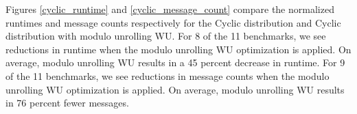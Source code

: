 Figures \ref{cyclic_runtime} and \ref{cyclic_message_count} compare the normalized runtimes and message counts respectively for the Cyclic distribution and Cyclic distribution with modulo unrolling WU. For 8 of the 11 benchmarks, we see reductions in runtime when the modulo unrolling WU optimization is applied. On average, modulo unrolling WU results in a 45 percent decrease in runtime. For 9 of the 11 benchmarks, we see reductions in message counts when the modulo unrolling WU optimization is applied. On average, modulo unrolling WU results in 76 percent fewer messages. 

